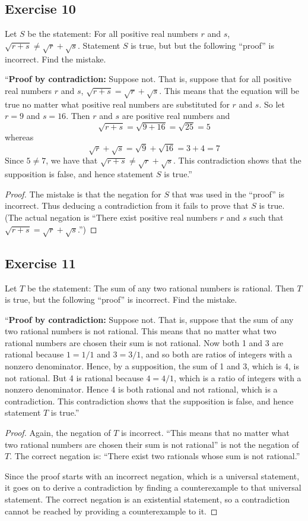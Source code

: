 \documentclass[14pt]{extarticle}
\begin{document}
\subsection{Exercise 10}
Let $S$ be the statement: For all positive real numbers $r$ and $s$, $\sqrt{r+s} \neq \sqrt{r} + \sqrt{s}$. Statement $S$ is true, but but the following “proof” is incorrect. Find the mistake.

“{\bf Proof by contradiction:} Suppose not. That is, suppose that for all positive real numbers $r$ and $s$, $\sqrt{r + s} = \sqrt{r} + \sqrt{s}$. This means that the equation will be true no matter what positive real numbers are substituted for $r$ and $s$. So let $r = 9$ and $s = 16$. Then $r$ and $s$ are positive real numbers and
\[
\sqrt{r+s} = \sqrt{9 + 16} = \sqrt{25} = 5
\]
whereas
\[
\sqrt{r}+\sqrt{s} = \sqrt{9} + \sqrt{16} = 3+4 = 7
\]
Since $5 \neq 7$, we have that $\sqrt{r + s} \neq \sqrt{r} + \sqrt{s}$. This contradiction shows that the supposition is false, and hence statement $S$ is true.”

\begin{proof}
The mistake is that the negation for $S$ that was used in the “proof” is incorrect. Thus deducing a contradiction from it fails to prove that $S$ is true. (The actual negation is “There exist positive real numbers $r$ and $s$ such that $\sqrt{r + s} = \sqrt{r} + \sqrt{s}$.”)
\end{proof}

\subsection{Exercise 11}
Let $T$ be the statement: The sum of any two rational numbers is rational. Then $T$ is true, but the following “proof” is incorrect. Find the mistake.

“{\bf Proof by contradiction:} Suppose not. That is, suppose that the sum of any two rational numbers is not rational. This means that no matter what two rational numbers are chosen their sum is not rational. Now both 1 and 3 are rational because $1 = 1/1$ and $3 = 3/1$, and so both are ratios of integers with a nonzero denominator. Hence, by a supposition, the sum of 1 and 3, which is 4, is not rational. But 4 is rational because $4 = 4/1$, which is a ratio of integers with a nonzero denominator. Hence 4 is both rational and not rational, which is a contradiction. This contradiction shows that the supposition is false, and hence statement $T$ is true.”

\begin{proof}
Again, the negation of $T$ is incorrect. ``This means that no matter what two rational numbers are chosen their sum is not rational'' is not the negation of $T$. The correct negation is: ``There exist two rationals whose sum is not rational.''

Since the proof starts with an incorrect negation, which is a universal statement, it goes on to derive a contradiction by finding a counterexample to that universal statement. The correct negation is an existential statement, so a contradiction cannot be reached by providing a counterexample to it.
\end{proof}
\end{document}
